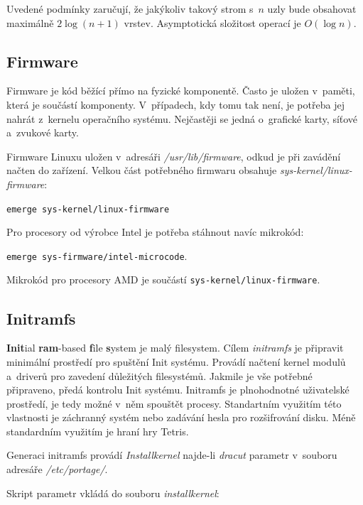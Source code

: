 \documentclass[12pt,a4paper,twoside,]{article}
\begin{document}
{{{{{{{\hspace*{-1.5em}Uvedené podmínky zaručují, že jakýkoliv takový strom s~$n$ uzly bude obsahovat \\maximálně $2\log(n+1)$ vrstev. Asymptotická složitost operací je $O(\log n)$.\\



\subsection{\textsf{Firmware}}
Firmware je kód běžící přímo na fyzické komponentě. Často je uložen v~paměti, která je součástí komponenty. V~případech, kdy tomu tak není, je potřeba jej nahrát z~kernelu operačního systému. Nejčastěji se jedná o~grafické karty, síťové a~zvukové karty. 

Firmware Linuxu uložen v~adresáři \textit{/usr/lib/firmware}, odkud je při zavádění načten do zařízení. Velkou část potřebného firmwaru obsahuje \textit{sys-kernel/linux-firmware}:

\texttt{emerge sys-kernel/linux-firmware}

\hspace{-1.5em}Pro procesory od výrobce Intel je potřeba stáhnout navíc mikrokód:

\texttt{emerge sys-firmware/intel-microcode}. 

\hspace{-1.5em}Mikrokód pro procesory AMD je součástí  \texttt{sys-kernel/linux-firmware}.
\subsection{\textsf{Initramfs}} \hypertarget{Initramfs}{}
{\bf Init}ial {\bf ram}-based {\bf f}ile {\bf s}ystem je malý filesystem. Cílem \textit{initramfs} je připravit minimální prostředí pro spuštění Init systému. Provádí načtení kernel modulů a~driverů pro zavedení důležitých filesystémů. Jakmile je vše potřebné připraveno, předá kontrolu Init systému.
Initramfs je plnohodnotné uživatelské prostředí, je tedy možné v~něm spouštět procesy. Standartním využitím této vlastnosti je záchranný systém nebo zadávání hesla pro rozšifrování disku. Méně standardním využitím je hraní hry Tetris. 

Generaci initramfs provádí \textit{Installkernel} najde-li \textit{dracut} parametr v~souboru adresáře \textit{/etc/portage/}.

\hspace{-1.5em}Skript parametr vkládá do souboru \textit{installkernel}:

}}}}}}}
\end{document}
